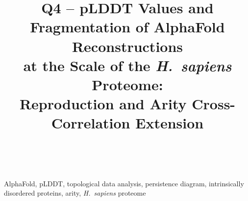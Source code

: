 \documentclass[conference]{IEEEtran}
\begin{document}
\title{Q4 -- pLDDT Values and Fragmentation of AlphaFold Reconstructions\\
       at the Scale of the \textit{H.~sapiens} Proteome:\\
       Reproduction and Arity Cross-Correlation Extension}

\author{%
  \\
}

\maketitle

\begin{abstract}
{\normalfont\small{}\selectfont}
\end{abstract}

\begin{IEEEkeywords}
AlphaFold, pLDDT, topological data analysis, persistence diagram,
intrinsically disordered proteins, arity, \textit{H.~sapiens} proteome
\end{IEEEkeywords}











\end{document}
